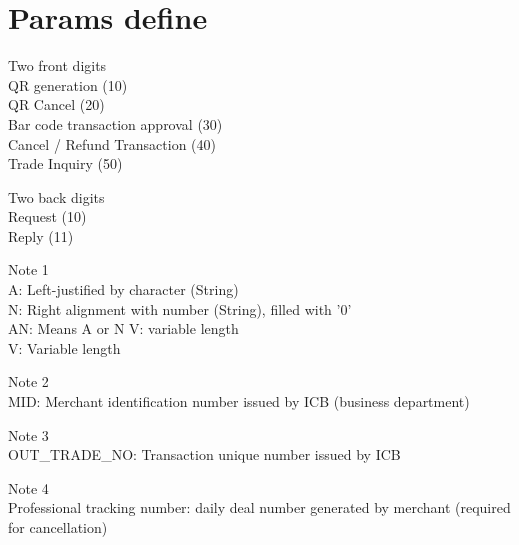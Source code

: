 \documentclass[12pt]{article}
\begin{document}
\section{Params define}\label{previous work}
\begin{description}
    \item Two front digits \\
        QR generation (10) \\
        QR Cancel (20) \\
        Bar code transaction approval (30) \\
        Cancel / Refund Transaction (40) \\
        Trade Inquiry (50) \\
    \item Two back digits \\
        Request (10) \\
        Reply (11) \\
    \item Note 1 \\
    A: Left-justified by character (String) \\
    N: Right alignment with number (String), filled with '0' \\
    AN: Means A or N V: variable length \\
    V: Variable length \\
    \item Note 2 \\
    MID: Merchant identification number issued by ICB (business department) \\
    \item Note 3 \\
    OUT\_TRADE\_NO: Transaction unique number issued by ICB \\
    \item Note 4 \\ 
    Professional tracking number: daily deal number generated by merchant (required for cancellation)\\
\end{description}
\end{document}

